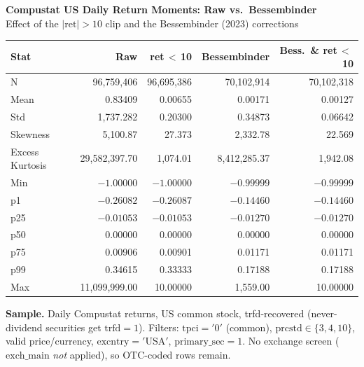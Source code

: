\documentclass[11pt]{article}
\begin{document}
\thispagestyle{empty}

\begin{center}
{\large\bfseries Compustat US Daily Return Moments: Raw vs.\ Bessembinder}\\[2pt]
{\small Effect of the $|\mathrm{ret}|>10$ clip and the Bessembinder (2023) corrections}
\end{center}

\vspace{0.5em}

\begin{center}
\begin{tabular}{l r r r r}
\toprule
Stat & {Raw} & {ret\,$<$\,10} & {Bessembinder} & {Bess.\ \& ret\,$<$\,10} \\
\midrule
N               & 96{,}759{,}406 & 96{,}695{,}386 & 70{,}102{,}914 & 70{,}102{,}318 \\
Mean            & 0.83409  & 0.00655  & 0.00171  & 0.00127 \\
Std             & 1{,}737.282 & 0.20300  & 0.34873  & 0.06642 \\
Skewness        & 5{,}100.87  & 27.373   & 2{,}332.78  & 22.569 \\
Excess Kurtosis & 29{,}582{,}397.70 & 1{,}074.01 & 8{,}412{,}285.37 & 1{,}942.08 \\
Min             & $-1.00000$ & $-1.00000$ & $-0.99999$ & $-0.99999$ \\
p1              & $-0.26082$ & $-0.26087$ & $-0.14460$ & $-0.14460$ \\
p25             & $-0.01053$ & $-0.01053$ & $-0.01270$ & $-0.01270$ \\
p50             & 0.00000  & 0.00000  & 0.00000  & 0.00000 \\
p75             & 0.00906  & 0.00901  & 0.01171  & 0.01171 \\
p99             & 0.34615  & 0.33333  & 0.17188  & 0.17188 \\
Max             & 11{,}099{,}999.00 & 10.00000 & 1{,}559.00 & 10.00000 \\
\bottomrule
\end{tabular}
\end{center}

\vspace{1em}

\noindent\footnotesize
\textbf{Sample.} Daily Compustat returns, US common stock, trfd-recovered
(never-dividend securities get $\mathrm{trfd}=1$). Filters:
$\mathrm{tpci}='0'$ (common), $\mathrm{prcstd}\in\{3,4,10\}$, valid price/currency,
$\mathrm{excntry}='\mathrm{USA}'$, $\mathrm{primary\_sec}=1$. No exchange screen
($\mathrm{exch\_main}$ \emph{not} applied), so OTC-coded rows remain.
\end{document}
